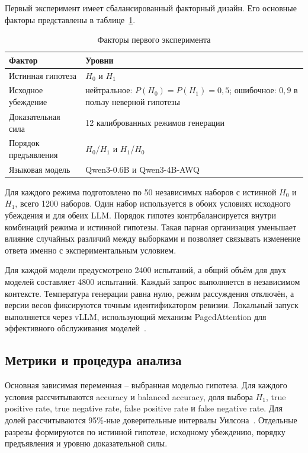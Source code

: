 \documentclass[a4paper,14pt]{extarticle}
\newcommand{\Hnull}{\ensuremath{H_0}}
\newcommand{\Hone}{\ensuremath{H_1}}
\begin{document}
Первый эксперимент имеет сбалансированный факторный дизайн. Его основные факторы представлены в таблице~\ref{tab:factors}.

\begin{table}[ht]
  \centering
  \caption{Факторы первого эксперимента}
  \label{tab:factors}
  \begin{tabularx}{\textwidth}{>{\raggedright\arraybackslash}p{} X}
    \toprule
    \textbf{Фактор} & \textbf{Уровни} \\
    \midrule
    Истинная гипотеза & \Hnull{} и \Hone{} \\
    Исходное убеждение & нейтральное: $P(H_0)=P(H_1)=0{,}5$; ошибочное: $0{,}9$ в пользу неверной гипотезы \\
    Доказательная сила & 12 калиброванных режимов генерации \\
    Порядок предъявления & \Hnull/\Hone{} и \Hone/\Hnull{} \\
    Языковая модель & Qwen3-0.6B и Qwen3-4B-AWQ \\
    \bottomrule
  \end{tabularx}
\end{table}

Для каждого режима подготовлено по 50 независимых наборов с истинной \Hnull{} и \Hone, всего 1200 наборов. Один набор используется в обоих условиях исходного убеждения и для обеих LLM. Порядок гипотез контрбалансируется внутри комбинаций режима и истинной гипотезы. Такая парная организация уменьшает влияние случайных различий между выборками и позволяет связывать изменение ответа именно с экспериментальным условием.

Для каждой модели предусмотрено 2400 испытаний, а общий объём для двух моделей составляет 4800 испытаний. Каждый запрос выполняется в независимом контексте. Температура генерации равна нулю, режим рассуждения отключён, а версии весов фиксируются точным идентификатором ревизии. Локальный запуск выполняется через vLLM, использующий механизм PagedAttention для эффективного обслуживания моделей~\cite{vllm}.

\subsection{Метрики и процедура анализа}

Основная зависимая переменная -- выбранная моделью гипотеза. Для каждого условия рассчитываются accuracy и balanced accuracy, доля выбора \Hone, true positive rate, true negative rate, false positive rate и false negative rate. Для долей рассчитываются 95\%-ные доверительные интервалы Уилсона~\cite{wilson}. Отдельные разрезы формируются по истинной гипотезе, исходному убеждению, порядку предъявления и уровню доказательной силы.
\end{document}
